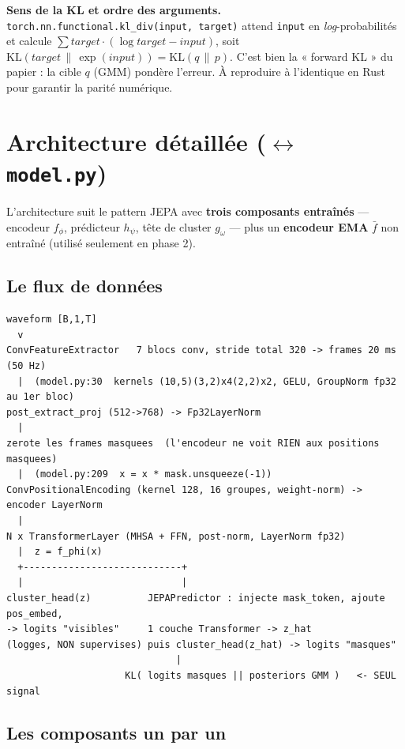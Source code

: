 \documentclass[11pt,a4paper]{article}
\newcommand{\code}[1]{\texttt{#1}}
\newcommand{\file}[1]{\texttt{#1}}
\begin{document}
\begin{warnbox}
\textbf{Sens de la KL et ordre des arguments.}
\code{torch.nn.functional.kl\_div(input, target)} attend
\code{input} en \emph{log}-probabilités et calcule
$\sum target\cdot(\log target - input)$, soit $\mathrm{KL}(target\,\|\,
\exp(input)) = \mathrm{KL}(q\,\|\,p)$. C'est bien la « forward KL » du
papier : la cible $q$ (GMM) pondère l'erreur. À reproduire à l'identique
en Rust pour garantir la parité numérique.
\end{warnbox}

\section{Architecture détaillée (\texorpdfstring{$\leftrightarrow$}{<->} \file{model.py})}

L'architecture suit le pattern JEPA avec \textbf{trois composants
entraînés} --- encodeur $f_\phi$, prédicteur $h_\psi$, tête de cluster
$g_\omega$ --- plus un \textbf{encodeur EMA} $\bar f$ non entraîné
(utilisé seulement en phase 2).

\subsection{Le flux de données}

\begin{lstlisting}
waveform [B,1,T]
  v
ConvFeatureExtractor   7 blocs conv, stride total 320 -> frames 20 ms (50 Hz)
  |  (model.py:30  kernels (10,5)(3,2)x4(2,2)x2, GELU, GroupNorm fp32 au 1er bloc)
post_extract_proj (512->768) -> Fp32LayerNorm
  |
zerote les frames masquees  (l'encodeur ne voit RIEN aux positions masquees)
  |  (model.py:209  x = x * mask.unsqueeze(-1))
ConvPositionalEncoding (kernel 128, 16 groupes, weight-norm) -> encoder LayerNorm
  |
N x TransformerLayer (MHSA + FFN, post-norm, LayerNorm fp32)
  |  z = f_phi(x)
  +----------------------------+
  |                            |
cluster_head(z)          JEPAPredictor : injecte mask_token, ajoute pos_embed,
-> logits "visibles"     1 couche Transformer -> z_hat
(logges, NON supervises) puis cluster_head(z_hat) -> logits "masques"
                              |
                     KL( logits masques || posteriors GMM )   <- SEUL signal
\end{lstlisting}

\subsection{Les composants un par un}
\end{document}
